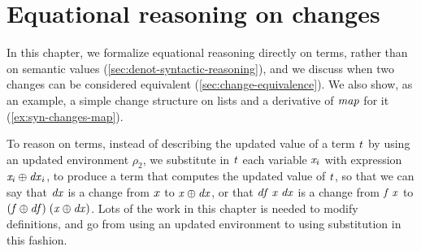 









\def\deriveDefCore{%
\begin{align*}
  \ensuremath{\Derive{\lambda (\Varid{x}\typcolon\sigma)\to \Varid{t}}} &= \ensuremath{\lambda (\Varid{x}\typcolon\sigma)\;(\Varid{dx}\typcolon\Delta \sigma)\to \Derive{\Varid{t}}} \\
  \ensuremath{\Derive{\Varid{s}\;\Varid{t}}} &= \ensuremath{\Derive{\Varid{s}}\;\Varid{t}\;\Derive{\Varid{t}}} \\
  \ensuremath{\Derive{\Varid{x}}} &= \ensuremath{\Varid{dx}} \\
  \ensuremath{\Derive{\Varid{c}}} &= \ensuremath{\DeriveConst{\Varid{c}}}
\end{align*}
}




\chapter{Equational reasoning on changes}
\label{sec:term-reasoning}
\label{ch:term-reasoning}

In this chapter, we formalize equational reasoning
directly on terms, rather than on semantic values
(\cref{sec:denot-syntactic-reasoning}), and we discuss
when two changes can be considered equivalent
(\cref{sec:change-equivalence}).
We also show, as an example, a simple change structure on lists
and a derivative of \ensuremath{\Varid{map}} for it (\cref{ex:syn-changes-map}).

To reason on terms, instead of describing the updated value of a
term \ensuremath{\Varid{t}} by using an updated environment \ensuremath{\rho_{2}}, we substitute in
\ensuremath{\Varid{t}} each variable \ensuremath{\Varid{x}_i} with expression \ensuremath{\Varid{x}_i\oplus \Varid{dx}_i}, to
produce a term that computes the updated value of \ensuremath{\Varid{t}}, so that we
can say that \ensuremath{\Varid{dx}} is a change from \ensuremath{\Varid{x}} to \ensuremath{\Varid{x}\oplus \Varid{dx}}, or that
\ensuremath{\Varid{df}\;\Varid{x}\;\Varid{dx}} is a change from \ensuremath{\Varid{f}\;\Varid{x}} to \ensuremath{(\Varid{f}\oplus \Varid{df})\;(\Varid{x}\oplus \Varid{dx})}. Lots of the work in this chapter is needed to modify
definitions, and go from using an updated environment to using
substitution in this fashion.

